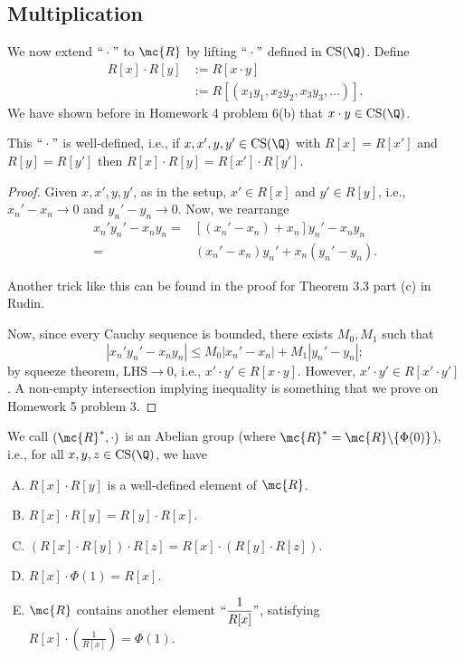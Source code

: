 \subsection{Multiplication}
We now extend \(``\cdot"\) to \(\mc{R}\) by lifting \(``\cdot"\) defined in \(\operatorname{CS}(\Q)\). Define 
\begin{align*}
	R[x]\cdot R[y]&:=R[x\cdot y]\\
				  &:=R[(x_1y_1,x_2y_2,x_3y_3,\dots)].
\end{align*}
We have shown before in Homework 4 problem 6(b) that \(x\cdot y\in\operatorname{CS}(\Q)\).
\begin{nproposition}{}
	This \(``\cdot"\) is well-defined, i.e., if \(x,x',y,y'\in\operatorname{CS}(\Q)\) with \(R[x]=R[x']\) and \(R[y]=R[y']\) then \(R[x]\cdot R[y]=R[x']\cdot R[y']\).
\end{nproposition}
\begin{proof}
	Given \(x,x',y,y'\), as in the setup, \(x'\in R[x]\) and \(y'\in R[y]\), i.e., \(x_n'-x_n\to 0\) and \(y_n'-y_n\to 0\). Now, we rearrange 
	\begin{align*}
		x_n'y_n'-x_ny_n=&[(x_n'-x_n)+x_n]y_n'-x_ny_n\\
					   =&(x_n'-x_n)y_n'+x_n(y_n'-y_n).
	\end{align*}
	\begin{note}
		Another trick like this can be found in the proof for Theorem 3.3 part (c) in Rudin.
	\end{note}
	Now, since every Cauchy sequence is bounded, there exists \(M_0,M_1\) such that 
	\begin{equation*}
		|x_n'y_n'-x_ny_n|\leq M_0|x_n'-x_n|+M_1|y_n'-y_n|;
	\end{equation*}
	by squeeze theorem, \(\text{LHS}\to 0\), i.e., \(x'\cdot y'\in R[x\cdot y]\). However, \(x'\cdot y'\in R[x'\cdot y']\). A non-empty intersection implying inequality is something that we prove on Homework 5 problem 3.
\end{proof}
\begin{nproposition}{}
	We call \((\mc{R}^*,\cdot)\) is an Abelian group (where \(\mc{R}^*=\mc{R}\backslash\{\Phi(0)\}\)), i.e., for all \(x,y,z\in \operatorname{CS}(\Q)\), we have
	\begin{enumerate}[(A)]
		\item \(R[x]\cdot R[y]\) is a well-defined element of \(\mc{R}\).
		
		\item \(R[x]\cdot R[y]=R[y]\cdot R[x]\).
		
		\item \((R[x]\cdot R[y])\cdot R[z]=R[x]\cdot(R[y]\cdot R[z])\).
		
		\item \(R[x]\cdot \Phi(1)=R[x]\).
		
		\item \(\mc{R}\) contains another element \(``\displaystyle\frac{1}{R[x]}"\), satisfying \(R[x]\cdot \left(\displaystyle\frac{1}{R[x]}\right)=\Phi(1)\).
	\end{enumerate}
\end{nproposition}
